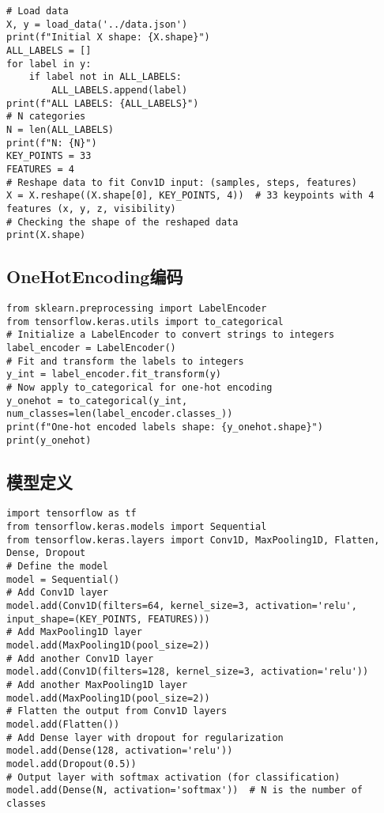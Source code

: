 \begin{lstlisting}
# Load data
X, y = load_data('../data.json')
print(f"Initial X shape: {X.shape}")
ALL_LABELS = []
for label in y:
    if label not in ALL_LABELS:
        ALL_LABELS.append(label)
print(f"ALL LABELS: {ALL_LABELS}")
# N categories
N = len(ALL_LABELS)
print(f"N: {N}")
KEY_POINTS = 33
FEATURES = 4
# Reshape data to fit Conv1D input: (samples, steps, features)
X = X.reshape((X.shape[0], KEY_POINTS, 4))  # 33 keypoints with 4 features (x, y, z, visibility)
# Checking the shape of the reshaped data
print(X.shape)
\end{lstlisting}

\subsection{OneHotEncoding编码}

\begin{lstlisting}
from sklearn.preprocessing import LabelEncoder
from tensorflow.keras.utils import to_categorical
# Initialize a LabelEncoder to convert strings to integers
label_encoder = LabelEncoder()
# Fit and transform the labels to integers
y_int = label_encoder.fit_transform(y)
# Now apply to_categorical for one-hot encoding
y_onehot = to_categorical(y_int, num_classes=len(label_encoder.classes_))
print(f"One-hot encoded labels shape: {y_onehot.shape}")
print(y_onehot)
\end{lstlisting}

\subsection{模型定义}

\begin{lstlisting}
import tensorflow as tf
from tensorflow.keras.models import Sequential
from tensorflow.keras.layers import Conv1D, MaxPooling1D, Flatten, Dense, Dropout
# Define the model
model = Sequential()
# Add Conv1D layer
model.add(Conv1D(filters=64, kernel_size=3, activation='relu', input_shape=(KEY_POINTS, FEATURES)))
# Add MaxPooling1D layer
model.add(MaxPooling1D(pool_size=2))
# Add another Conv1D layer
model.add(Conv1D(filters=128, kernel_size=3, activation='relu'))
# Add another MaxPooling1D layer
model.add(MaxPooling1D(pool_size=2))
# Flatten the output from Conv1D layers
model.add(Flatten())
# Add Dense layer with dropout for regularization
model.add(Dense(128, activation='relu'))
model.add(Dropout(0.5))
# Output layer with softmax activation (for classification)
model.add(Dense(N, activation='softmax'))  # N is the number of classes
\end{lstlisting}

